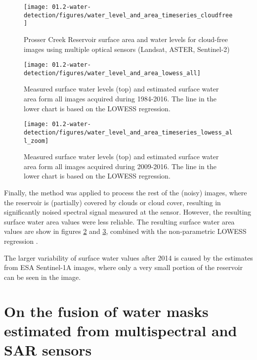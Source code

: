 \begin{figure}[H]
	\centering
	\texttt{[image: 01.2-water-detection/figures/water\_level\_and\_area\_timeseries\_cloudfree]}
	\caption{Prosser Creek Reservoir surface area and water levels for cloud-free images using multiple optical sensors (Landsat, ASTER, Sentinel-2)}
	\label{fig:water_level_and_area_timeseries_cloudfree}
\end{figure}

\begin{figure}[H]
	\centering
	\texttt{[image: 01.2-water-detection/figures/water\_level\_and\_area\_lowess\_all]}
	\caption{Measured surface water levels (top) and estimated surface water area form all images acquired during 1984-2016. The line in the lower chart is based on the LOWESS regression.}
	\label{fig:water_level_and_area_timeseries_lowess_all}
\end{figure}

\begin{figure}[H]
	\centering
	\texttt{[image: 01.2-water-detection/figures/water\_level\_and\_area\_timeseries\_lowess\_all\_zoom]}
	\caption{Measured surface water levels (top) and estimated surface water area form all images acquired during 2009-2016. The line in the lower chart is based on the LOWESS regression.}
	\label{fig:water_level_and_area_timeseries_lowess_all_zoom}
\end{figure}

Finally, the method was applied to process the rest of the (noisy) images, where the reservoir is (partially) covered by clouds or cloud cover, resulting in significantly noised spectral signal measured at the sensor. However, the resulting surface water area values were less reliable. The resulting surface water area values are show in figures \ref{fig:water_level_and_area_timeseries_lowess_all} and \ref{fig:water_level_and_area_timeseries_lowess_all_zoom}, combined with the non-parametric LOWESS regression \citep{cleveland1979robust}. 

The larger variability of surface water values after 2014 is caused by the estimates from ESA Sentinel-1A images, where only a very small portion of the reservoir can be seen in the image.

\section{On the fusion of water masks estimated from multispectral and SAR sensors}

